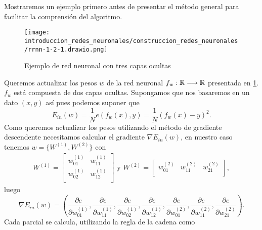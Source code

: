 Mostraremos un ejemplo primero antes de presentar el método general para facilitar la comprensión del algoritmo. 
\begin{figure}[h!]
    \texttt{[image: introduccion\_redes\_neuronales/construccion\_redes\_neuronales/rrnn-1-2-1.drawio.png]}
    \caption{Ejemplo de red neuronal con tres capas ocultas}
    \label{img:construccion_rrnn:rrnn-1-2-1}
\end{figure} 
Queremos actualizar los pesos $w$ de la red neuronal 
$f_w : \mathbb{R} \longrightarrow \mathbb{R}$ presentada en \ref{img:construccion_rrnn:rrnn-1-2-1}.
$f_w$ está compuesta de dos capas ocultas. Supongamos que nos basaremos en un dato 
$(x, y)$ así pues podemos suponer que 
\begin{equation}
    E_{in}(w) = \frac{1}{N}e(f_w(x), y) = \frac{1}{N} (f_w(x)- y)^2.
\end{equation}
Como queremos actualizar los pesos utilizando el método de gradiente descendente necesitamos calcular el gradiente $\nabla E_{in}(w)$, en nuestro caso tenemos $w=\{W^{(1)}, W^{(2)}\}$ con 
\begin{align}
    W^{(1)} = 
    \begin{bmatrix}
        w^{(1)}_{01} & w^{(1)}_{11} \\
        w^{(1)}_{02} & w^{(1)}_{12} \\
    \end{bmatrix} 
    \text{ y }
    W^{(2)} = 
    \begin{bmatrix}
        w^{(2)}_{01} & w^{(2)}_{11} & w^{(2)}_{21}\\
    \end{bmatrix}, 
\end{align}
luego 
\begin{equation}
    \nabla E_{in}(w) = 
    \left(
        \frac{\partial e}{\partial w^{(1)}_{01}},
        \frac{\partial e}{\partial w^{(1)}_{11}},
        \frac{\partial e}{\partial w^{(1)}_{02}},
        \frac{\partial e}{\partial w^{(1)}_{12}},
        \frac{\partial e}{\partial w^{(2)}_{01}},
        \frac{\partial e}{\partial w^{(2)}_{11}},
        \frac{\partial e}{\partial w^{(2)}_{21}}
    \right).
\end{equation} 
Cada parcial se calcula, utilizando la regla de la cadena como
